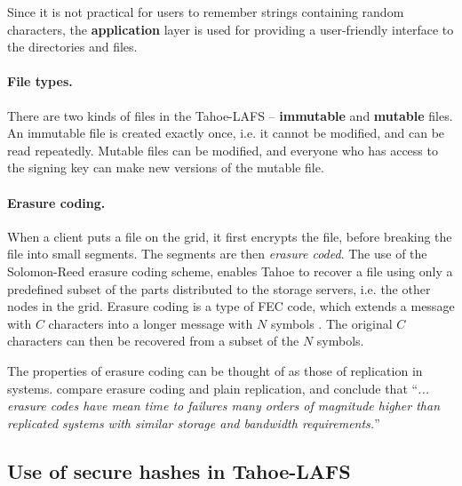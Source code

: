 \documentclass[english,12pt,a4paper]{book}
\begin{document}
Since it is not practical for users to remember strings containing random
characters, the \textbf{application} layer is used for providing a user-friendly
interface to the directories and files.

\paragraph{File types.}

There are two kinds of files in the Tahoe-\ac{LAFS} -- \textbf{immutable} and
\textbf{mutable} files. An immutable file is created exactly once, i.e. it
cannot be modified, and can be read repeatedly. Mutable files can be modified,
and everyone who has access to the signing key can make new versions of
the mutable file.

\paragraph{Erasure coding.}

When a client puts a file on the grid, it first encrypts the file, before
breaking the file into small segments. The segments are then \emph{erasure
coded}.  The use of the Solomon-Reed erasure coding scheme, enables Tahoe to
recover a file using only a predefined subset of the parts distributed to the
storage servers, i.e. the other nodes in the grid. Erasure coding is a type of
\ac{FEC} code, which extends a message with $C$ characters into a longer message
with $N$ symbols \cite{t_reed-solomon}.  The original $C$ characters can then be
recovered from a subset of the $N$ symbols.

The properties of erasure coding can be thought of as those of replication in
 systems. \citet*{t_erasure} compare erasure coding and plain
replication, and conclude that ``\emph{...  erasure codes have mean time to
failures many orders of magnitude higher than replicated systems with similar
storage and bandwidth requirements.}''

\subsection{Use of secure hashes in Tahoe-LAFS}
\end{document}
